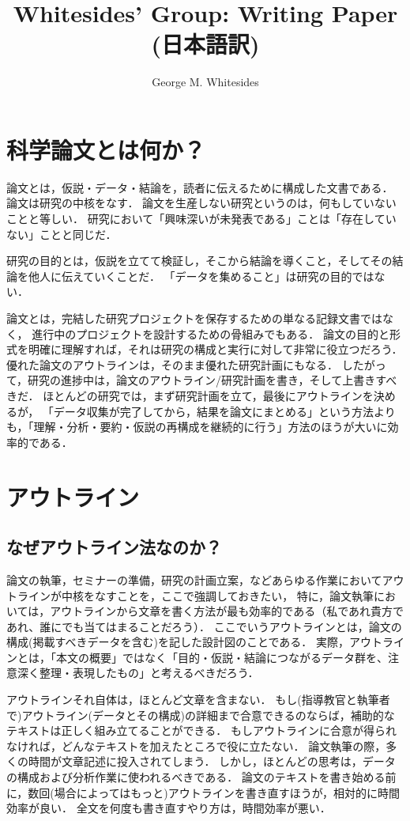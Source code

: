 \documentclass[twocolumn, 10pt,a4j]{jarticle}
\title{Whitesides' Group: Writing Paper (日本語訳)}
\author{George M. Whitesides}
\date{}
\begin{document}
  \maketitle

  \section{科学論文とは何か？}
    論文とは，仮説・データ・結論を，読者に伝えるために構成した文書である．
    論文は研究の中核をなす．
    論文を生産しない研究というのは，何もしていないことと等しい．
    研究において「興味深いが未発表である」ことは「存在していない」ことと同じだ．

    研究の目的とは，仮説を立てて検証し，そこから結論を導くこと，そしてその結論を他人に伝えていくことだ．
    「データを集めること」は研究の目的ではない．

    論文とは，完結した研究プロジェクトを保存するための単なる記録文書ではなく，
    進行中のプロジェクトを設計するための骨組みでもある．
    論文の目的と形式を明確に理解すれば，それは研究の構成と実行に対して非常に役立つだろう．
    優れた論文のアウトラインは，そのまま優れた研究計画にもなる．
    したがって，研究の進捗中は，論文のアウトライン/研究計画を書き，そして上書きすべきだ．
    ほとんどの研究では，まず研究計画を立て，最後にアウトラインを決めるが，
    「データ収集が完了してから，結果を論文にまとめる」という方法よりも，「理解・分析・要約・仮説の再構成を継続的に行う」方法のほうが大いに効率的である．

  \section{アウトライン}
    \subsection{なぜアウトライン法なのか？}
    論文の執筆，セミナーの準備，研究の計画立案，などあらゆる作業においてアウトラインが中核をなすことを，ここで強調しておきたい，
    特に，論文執筆においては，アウトラインから文章を書く方法が最も効率的である（私であれ貴方であれ、誰にでも当てはまることだろう）．
    ここでいうアウトラインとは，論文の構成(掲載すべきデータを含む)を記した設計図のことである．
    実際，アウトラインとは，「本文の概要」ではなく「目的・仮説・結論につながるデータ群を、注意深く整理・表現したもの」と考えるべきだろう．

    アウトラインそれ自体は，ほとんど文章を含まない．
    もし(指導教官と執筆者で)アウトライン(データとその構成)の詳細まで合意できるのならば，補助的なテキストは正しく組み立てることができる．
    もしアウトラインに合意が得られなければ，どんなテキストを加えたところで役に立たない．
    論文執筆の際，多くの時間が文章記述に投入されてしまう．
    しかし，ほとんどの思考は，データの構成および分析作業に使われるべきである．
    論文のテキストを書き始める前に，数回(場合によってはもっと)アウトラインを書き直すほうが，相対的に時間効率が良い．
    全文を何度も書き直すやり方は，時間効率が悪い．
\end{document}
